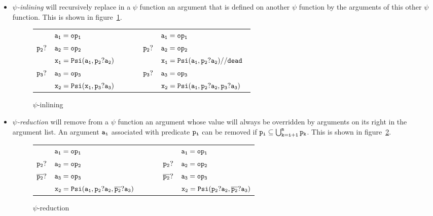 \begin{itemize}

\item{\emph{$\psi$-inlining}} will recursively replace in a $\psi$
  function an argument that is defined on another $\psi$ function by
  the arguments of this other $\psi$ function. This is shown in
  figure~\ref{fig:psi_inlining}.

\begin{figure}
\begin{center}
\footnotesize
\begin{tabular}{lllll}
             & ${\tt a_1 = op_1}$             & \ \ \ \  &             & ${\tt a_1 = op_1}$ \\
${\tt p_2?}$ & ${\tt a_2 = op_2}$             & \ \ \ \  & ${\tt p_2?}$ & ${\tt a_2 = op_2}$ \\
             & ${\tt x_1 = Psi(a_1, p_2?a_2)}$ & \ \ \ \  &             & ${\tt x_1 = Psi(a_1, p_2?a_2) // dead}$ \\
${\tt p_3?}$ & ${\tt a_3 = op_3}$              & \ \ \ \  & ${\tt p_3?}$ & ${\tt a_3 = op_3}$ \\
             & ${\tt x_2 = Psi(x_1, p_3?a_3)}$ & \ \ \ \  &              &${\tt x_2 = Psi(a_1, p_2?a_2, p_3?a_3)}$ \
\end{tabular}
\caption{$\psi$-inlining}
\label{fig:psi_inlining}
\end{center}
\end{figure}


\item{\emph{$\psi$-reduction}} will remove from a $\psi$ function an
  argument whose value will always be overridden by arguments on its
  right in the argument list. An argument ${\tt a_i}$ associated with
  predicate ${\tt p_i}$ can be removed if ${\tt p_i \subseteq
    \bigcup_{k=i+1}^n p_k}$. This is shown in
  figure~\ref{fig:psi_reduction}.

\begin{figure}
\begin{center}
\footnotesize
\begin{tabular}{lllll}
             & ${\tt a_1 = op_1}$             & \ \ \ \  &             & ${\tt a_1 = op_1}$ \\
${\tt p_2?}$ & ${\tt a_2 = op_2}$             & \ \ \ \  & ${\tt p_2?}$ & ${\tt a_2 = op_2}$ \\
${\tt \overline{p_2}?}$ & ${\tt a_3 = op_3}$              & \ \ \ \  & ${\tt \overline{p_2}?}$ & ${\tt a_3 = op_3}$ \\
             & ${\tt x_2 = Psi(a_1, p_2?a_2, \overline{p_2}?a_3)}$ & \ \ \ \  &              &${\tt x_2 = Psi(p_2?a_2, \overline{p_2}?a_3)}$ \\
\end{tabular}
\caption{$\psi$-reduction}
\label{fig:psi_reduction}
\end{center}
\end{figure}


\end{itemize}
